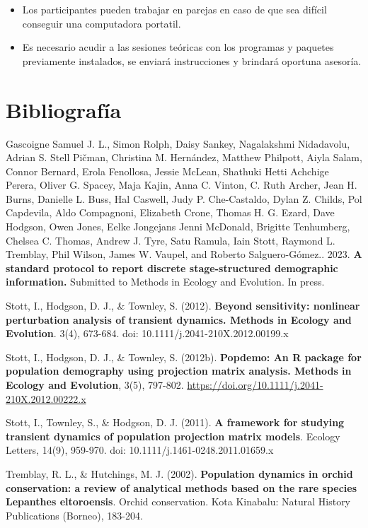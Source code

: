 \documentclass[
]{book}
\providecommand{\tightlist}{%
  \setlength{\itemsep}{0pt}\setlength{\parskip}{0pt}}
\theoremstyle{definition}
\theoremstyle{definition}
\theoremstyle{definition}
\theoremstyle{definition}
\theoremstyle{remark}
\begin{document}
\begin{itemize}
\tightlist
\item
  Los participantes pueden trabajar en parejas en caso de que sea
  difícil conseguir una computadora portatil.\\
\item
  Es necesario acudir a las sesiones teóricas con los programas y
  paquetes previamente instalados, se enviará instrucciones y brindará
  oportuna asesoría.
\end{itemize}

\hypertarget{bibliografuxeda}{%
\section{Bibliografía}\label{bibliografuxeda}}

Gascoigne Samuel J. L., Simon Rolph, Daisy Sankey, Nagalakshmi
Nidadavolu, Adrian S. Stell Pičman, Christina M. Hernández, Matthew
Philpott, Aiyla Salam, Connor Bernard, Erola Fenollosa, Jessie McLean,
Shathuki Hetti Achchige Perera, Oliver G. Spacey, Maja Kajin, Anna C.
Vinton, C. Ruth Archer, Jean H. Burns, Danielle L. Buss, Hal Caswell,
Judy P. Che-Castaldo, Dylan Z. Childs, Pol Capdevila, Aldo Compagnoni,
Elizabeth Crone, Thomas H. G. Ezard, Dave Hodgson, Owen Jones, Eelke
Jongejans Jenni McDonald, Brigitte Tenhumberg, Chelsea C. Thomas, Andrew
J. Tyre, Satu Ramula, Iain Stott, Raymond L. Tremblay, Phil Wilson,
James W. Vaupel, and Roberto Salguero-Gómez.. 2023. \textbf{A standard
protocol to report discrete stage-structured demographic information.}
Submitted to Methods in Ecology and Evolution. In press.

Stott, I., Hodgson, D. J., \& Townley, S. (2012). \textbf{Beyond sensitivity:
nonlinear perturbation analysis of transient dynamics. Methods in
Ecology and Evolution}. 3(4), 673-684. doi:
10.1111/j.2041-210X.2012.00199.x

Stott, I., Hodgson, D. J., \& Townley, S. (2012b). \textbf{Popdemo: An R
package for population demography using projection matrix analysis.
Methods in Ecology and Evolution}, 3(5), 797-802.
\url{https://doi.org/10.1111/j.2041-210X.2012.00222.x}

Stott, I., Townley, S., \& Hodgson, D. J. (2011). \textbf{A framework for
studying transient dynamics of population projection matrix models}.
Ecology Letters, 14(9), 959-970. doi: 10.1111/j.1461-0248.2011.01659.x

Tremblay, R. L., \& Hutchings, M. J. (2002). \textbf{Population dynamics in
orchid conservation: a review of analytical methods based on the rare
species Lepanthes eltoroensis}. Orchid conservation. Kota Kinabalu:
Natural History Publications (Borneo), 183-204.
\end{document}
